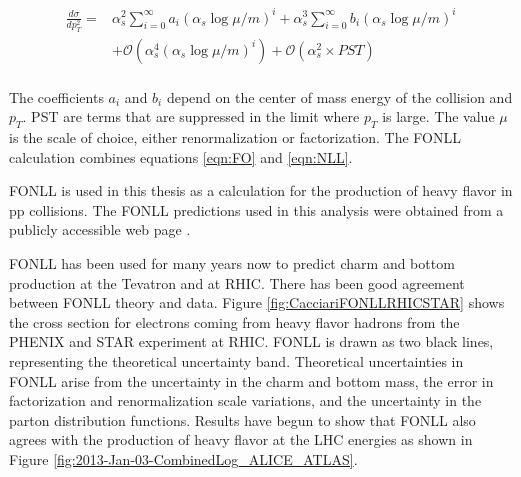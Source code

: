 \begin{equation}\label{eqn:NLL}
\begin{aligned}
 \frac{d \sigma}{d p_{T}^{2}}  ={} & \alpha_{s}^{2} \sum_{i=0}^{\infty} a_{i} (\alpha_{s} \log \mu / m)^{i}  + \alpha_{s}^{3} \sum_{i=0}^{\infty} b_{i} (\alpha_{s} \log \mu / m)^{i}\\
      & +  \mathcal{O} (\alpha_{s}^{4}(\alpha_{s} \log \mu / m)^{i}) + \mathcal{O} (\alpha_{s}^{2} \times PST) \\
\end{aligned}
\end{equation}

The coefficients $a_{i}$ and $b_{i}$ depend on the center of mass energy of the collision and $p_{T}$.  PST are terms that are suppressed in the limit where $p_{T}$ is large. The value $\mu$ is the scale of choice, either renormalization or factorization. The FONLL calculation combines equations \ref{eqn:FO} and \ref{eqn:NLL}.






FONLL \cite{Cacciari:1998it} is used in this thesis as a calculation for the production of heavy flavor in pp collisions. The FONLL predictions used in this analysis were obtained from a publicly accessible web page \cite{FONLLwebpage}.

FONLL has been used for many years now to predict charm and bottom production at the Tevatron and at RHIC. There has been good agreement between FONLL theory and data. Figure \ref{fig:CacciariFONLLRHICSTAR} \cite{Cacciari:2005rk} shows the cross section for electrons coming from heavy flavor hadrons from the PHENIX and STAR experiment at RHIC. FONLL is drawn as two black lines, representing the theoretical uncertainty band. Theoretical uncertainties in FONLL arise from the uncertainty in the charm and bottom mass, the error in factorization and renormalization scale variations, and the uncertainty in the parton distribution functions. Results have begun to show that FONLL also agrees with the production of heavy flavor at the LHC energies as shown in Figure \ref{fig:2013-Jan-03-CombinedLog_ALICE_ATLAS}.


